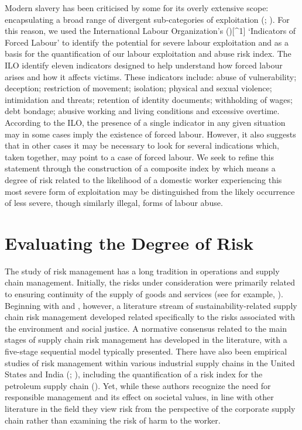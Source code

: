 \documentclass[
  12pt,
  letterpaper,
  DIV=11,
  numbers=noendperiod]{scrartcl}
\theoremstyle{plain}
\theoremstyle{definition}
\begin{document}
Modern slavery has been criticised by some for its overly extensive
scope: encapsulating a broad range of divergent sub-categories of
exploitation (\textcite{oconnell_davidson_margins_2015};
\textcite{gutierrez-huerter_o_change_2023}). For this reason, we used
the International Labour Organization's
(\textcite{ILO11-indicators}){[}\^{}1{]} `Indicators of Forced Labour'
to identify the potential for severe labour exploitation and as a basis
for the quantification of our labour exploitation and abuse risk index.
The ILO identify eleven indicators designed to help understand how
forced labour arises and how it affects victims. These indicators
include: abuse of vulnerability; deception; restriction of movement;
isolation; physical and sexual violence; intimidation and threats;
retention of identity documents; withholding of wages; debt bondage;
abusive working and living conditions and excessive overtime. According
to the ILO, the presence of a single indicator in any given situation
may in some cases imply the existence of forced labour. However, it also
suggests that in other cases it may be necessary to look for several
indications which, taken together, may point to a case of forced labour.
We seek to refine this statement through the construction of a composite
index by which means a degree of risk related to the likelihood of a
domestic worker experiencing this most severe form of exploitation may
be distinguished from the likely occurrence of less severe, though
similarly illegal, forms of labour abuse.

\section{Evaluating the Degree of
Risk}\label{evaluating-the-degree-of-risk}

The study of risk management has a long tradition in operations and
supply chain management. Initially, the risks under consideration were
primarily related to ensuring continuity of the supply of goods and
services (see for example, \textcite{juttner_supply_2003}). Beginning
with \textcite{anderson_critical_2006} and
\textcite{anderson_sustainability_2009}, however, a literature stream of
sustainability-related supply chain risk management developed related
specifically to the risks associated with the environment and social
justice. A normative consensus related to the main stages of supply
chain risk management has developed in the literature, with a five-stage
sequential model typically presented. There have also been empirical
studies of risk management within various industrial supply chains in
the United States and India (\textcite{tarei_hybrid_2018};
\textcite{dellana_scale_2021}), including the quantification of a risk
index for the petroleum supply chain (\textcite{tarei_hybrid_2018}).
Yet, while these authors recognize the need for responsible management
and its effect on societal values, in line with other literature in the
field they view risk from the perspective of the corporate supply chain
rather than examining the risk of harm to the worker.
\end{document}
